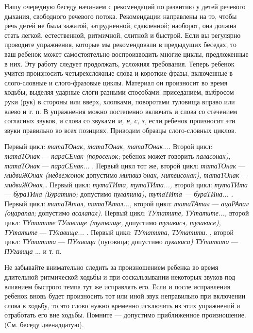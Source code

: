 \documentclass{book}
\renewcommand{\emph}[1]{\textit{#1}}
\begin{document}
Нашу очередную беседу начинаем с рекомендаций по развитию у детей
речевого дыхания, свободного речевого потока. Рекомендации направлены на
то, чтобы речь детей не была зажатой, затрудненной, сдавленной;
наоборот, она должна стать легкой, естественной, ритмичной, слитной и
быстрой. Если вы регулярно проводите упражнения, которые мы
рекомендовали в предыдущих беседах, то ваш ребенок может самостоятельно
воспроизводить многие циклы, предложенные в них. Эту работу следует
продолжать, усложняя требования. Теперь ребенок учится произносить
четырехсложные слова и короткие фразы, включенные в слого-словные и
слого-фразовые циклы. Материал он произносит во время ходьбы, выделяя
ударные слоги разными способами: приседанием, выбросом руки (рук) в
стороны или вверх, хлопками, поворотами туловища вправо или влево и т.
п. В упражнения можно постепенно включать и слова со стечением согласных
звуков, и слова со звуками \emph{м, н, с, з,} если ребенок произносит
эти звуки правильно во всех позициях. Приводим образцы слого-словных
циклов.

Первый цикл: \emph{татаТОнак, татаТОнак, татаТОнак.}... Второй цикл:
\emph{татаТОнак} --- \emph{параСЕнак (поросенок;} ребенок может говорить
\emph{паласонак), татаТОнак} --- \emph{параСЕнак...} . Первый цикл тот
же, второй цикл: \emph{татаТОнак} --- \emph{мидвиЖОнак (медвежонок}
допустимо \emph{митвиз'онак, митвисонак), татаТОнак} ---
\emph{мидвиЖОнак\ldots{}} Первый цикл: \emph{тутаТИта, тутаТИта...,}
второй цикл: \emph{тутаТИта}--- \emph{бураТИна (Буратино;} допустимо
\emph{пулатина), тутаТИта --- бураТИна... .} Первый цикл:
\emph{татаТАтал, татаТАтал...,} второй цикл: \emph{татаТАтал} ---
\emph{ацаРАпал (оцарапал;} допустимо \emph{асалапал).} Первый цикл:
\emph{ТУтатите, ТУтатите...,} второй цикл: \emph{ТУтатите ТУлавище
(туловище,} допустимо \emph{тулависэ, тулависе), ТУтатите} ---
\emph{ТУлавище... .} Первый цикл: \emph{ТУтатита, ТУтатити.} , второй
цикл: \emph{ТУтатита} --- \emph{ПУгавица} (пуговица; допустимо
\emph{пукависа) ТУтатита} --- \emph{ПУгавица} ... и т. п.

Не забывайте внимательно следить за произношением ребенка во время
длительной ритмической ходьбы и при соскальзывании некоторых звуков под
влиянием быстрого темпа тут же исправлять его. Если и после исправления
ребенок вновь будет произносить тот или иной звук неправильно при
включении слова в ходьбу, то это слово нужно временно исключить из этих
упражнений и отработать его вне ходьбы. Помните --- допустимо
приближенное произношение. (См. беседу двенадцатую).
\end{document}
